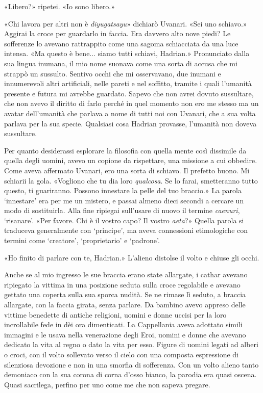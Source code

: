 «Libero?» ripetei. «Io sono libero.»

«Chi lavora per altri non è \emph{diyugatsayu}» dichiarò Uvanari. «Sei
uno schiavo.» Aggirai la croce per guardarlo in faccia. Era davvero alto
nove piedi? Le sofferenze lo avevano rattrappito come una sagoma
schiacciata da una luce intensa. «Ma questo è bene... siamo tutti
schiavi, Hadrian.» Pronunciato dalla sua lingua inumana, il mio nome
suonava come una sorta di accusa che mi strappò un sussulto. Sentivo
occhi che mi osservavano, due inumani e innumerevoli altri artificiali,
nelle pareti e nel soffitto, tramite i quali l'umanità presente e futura
mi avrebbe guardato. Sapevo che non avrei dovuto sussultare, che non
avevo il diritto di farlo perché in quel momento non ero me stesso ma un
avatar dell'umanità che parlava a nome di tutti noi con Uvanari, che a
sua volta parlava per la sua specie. Qualsiasi cosa Hadrian provasse,
l'umanità non doveva sussultare.

Per quanto desiderassi esplorare la filosofia con quella mente così
dissimile da quella degli uomini, avevo un copione da rispettare, una
missione a cui obbedire. Come aveva affermato Uvanari, ero una sorta di
schiavo. Il prefetto buono. Mi schiarii la gola. «Vogliono che tu dia
loro \emph{qualcosa}. Se lo farai, smetteranno tutto questo, ti
guariranno. Possono innestare la pelle del tuo braccio.» La parola
`innestare' era per me un mistero, e passai almeno dieci secondi a
cercare un modo di sostituirla. Alla fine ripiegai sull'usare di nuovo
il termine \emph{caenuri}, `risanare'. «Per favore. Chi è il vostro
capo? Il vostro \emph{aeta}?» Quella parola si traduceva generalmente
con `principe', ma aveva connessioni etimologiche con termini come
`creatore', `proprietario' e `padrone'.

«Ho finito di parlare con te, Hadrian.» L'alieno distolse il volto e
chiuse gli occhi.

Anche se al mio ingresso le sue braccia erano state allargate, i cathar
avevano ripiegato la vittima in una posizione seduta sulla croce
regolabile e avevano gettato una coperta sulla sua sporca nudità. Se ne
rimase lì seduto, a braccia allargate, con la faccia girata, senza
parlare. Da bambino avevo appreso delle vittime benedette di antiche
religioni, uomini e donne uccisi per la loro incrollabile fede in dèi
ora dimenticati. La Cappellania aveva adottato simili immagini e le
usava nella venerazione degli Eroi, uomini e donne che avevano dedicato
la vita al regno o dato la vita per esso. Figure di uomini legati ad
alberi o croci, con il volto sollevato verso il cielo con una composta
espressione di silenziosa devozione e non in una smorfia di sofferenza.
Con un volto alieno tanto demoniaco con la sua corona di corna d'osso
bianco, la parodia era quasi oscena. Quasi sacrilega, perfino per uno
come me che non sapeva pregare.

